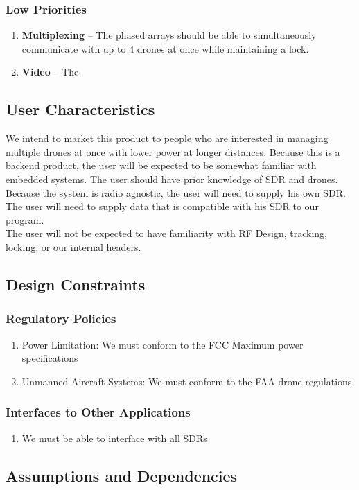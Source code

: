 \documentclass[ProjectRequirements.tex]{subfiles}
\begin{document}
		\subsubsection{Low Priorities}
			\begin{enumerate}
				\item \textbf{Multiplexing} -- The phased arrays should be able to simultaneously communicate with up to 4 drones at once while maintaining a lock.
				\item \textbf{Video} -- The 
			\end{enumerate}
		
	\subsection{User Characteristics}
		We intend to market this product to people who are interested in managing multiple drones at once with lower power at longer distances. Because this is a backend product, the user will be expected to be somewhat familiar with embedded systems. The user should have prior knowledge of SDR and drones. Because the system is radio agnostic, the user will need to supply his own SDR. The user will need to supply data that is compatible with his SDR to our program.\\
		
		The user will not be expected to have familiarity with RF Design, tracking, locking, or our internal headers.
		
	\subsection{Design Constraints}
		\subsubsection{Regulatory Policies}
			\begin{enumerate}
				\item Power Limitation: We must conform to the FCC Maximum power specifications
				\item Unmanned Aircraft Systems: We must conform to the FAA drone regulations.
			\end{enumerate}
		\subsubsection{Interfaces to Other Applications}
			\begin{enumerate}
				\item We must be able to interface with all SDRs
				
			\end{enumerate}

		
	\subsection{Assumptions and Dependencies}
	
\end{document}
